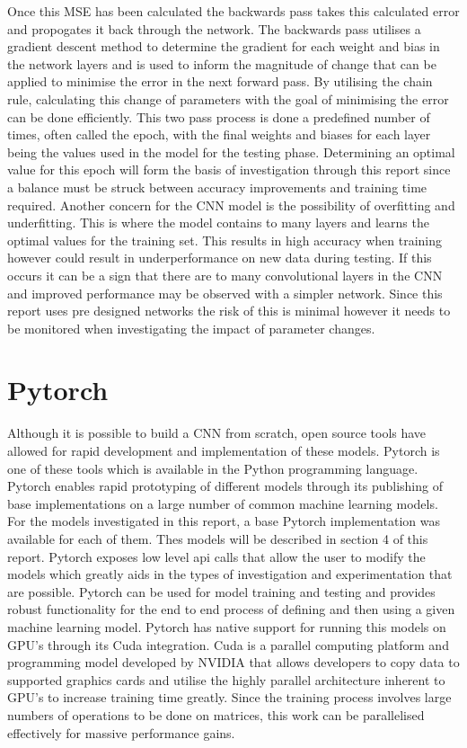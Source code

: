 \documentclass[10pt,twocolumn,letterpaper]{article}
\begin{document}
Once this MSE has been calculated the backwards pass takes this calculated error and 
propogates it back through the network. The backwards pass utilises a gradient descent 
method to determine the gradient for each weight and bias in the network layers and 
is used to inform the magnitude of change that can be applied to minimise the error in 
the next forward pass. By utilising the chain rule, calculating this change of parameters 
with the goal of minimising the error can be done efficiently. This two pass process is 
done a predefined number of times, often called the epoch, with the final weights and 
biases for each layer being the values used in the model for the testing phase. Determining 
an optimal value for this epoch will form the basis of investigation through this report 
since a balance must be struck between accuracy improvements and training time required.
Another concern for the CNN model is the possibility of overfitting and underfitting. This 
is where the model contains to many layers and learns the optimal values for the training 
set. This results in high accuracy when training however could result in underperformance 
on new data during testing. If this occurs it can be a sign that there are to many 
convolutional layers in the CNN and improved performance may be observed with a 
simpler network. Since this report uses pre designed networks the risk of this is minimal 
however it needs to be monitored when investigating the impact of parameter changes.
\section{Pytorch}
Although it is possible to build a CNN from scratch, open source tools have allowed for 
rapid development and implementation of these models. Pytorch is one of these tools which 
is available in the Python programming language. Pytorch enables rapid prototyping of 
different models through its publishing of base implementations on a large number of 
common machine learning models. For the models investigated in this report, a base Pytorch
implementation was available for each of them. Thes models will be described in section 4 
of this report. Pytorch exposes low level api calls that allow the user to modify the models 
which greatly aids in the types of investigation and experimentation that are possible.
Pytorch can be used for model training and testing and provides robust functionality for 
the end to end process of defining and then using a given machine learning model.
Pytorch has native support for running this models on GPU's through its Cuda integration.
Cuda is a parallel computing platform and programming model developed by NVIDIA \cite{Oh_2022}
that allows developers to copy data to supported graphics cards and utilise the highly 
parallel architecture inherent to GPU's to increase training time greatly. Since the training 
process involves large numbers of operations to be done on matrices, this work can be 
parallelised effectively for massive performance gains.
\end{document}
